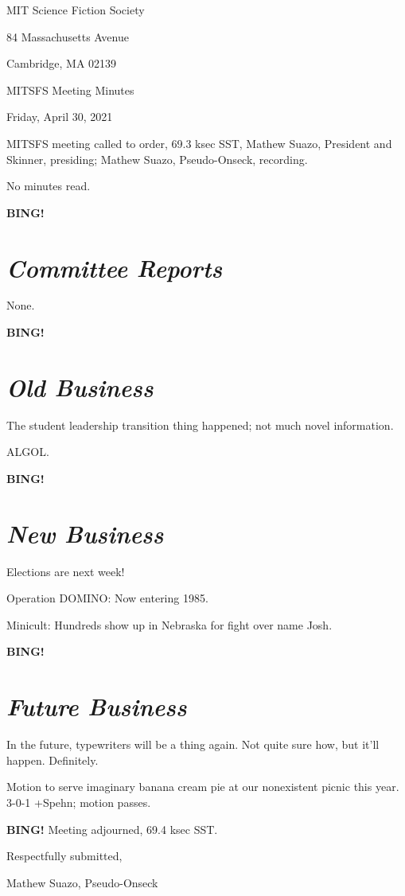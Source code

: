\documentclass[10pt]{article}
\newcommand{\bing}{{\bf BING!} }
\newcommand{\goto}[1]{\bing \vskip 12pt \section*{{\em{#1}}}}
\newcommand{\skinner}{Mathew Suazo, President and Skinner\xspace}
\newcommand{\onseck}{Mathew Suazo, Pseudo-Onseck\xspace}
\newcommand{\meetingdate}{Friday, April 30, 2021}
\begin{document}
\begin{center}

MIT Science Fiction Society

84 Massachusetts Avenue

Cambridge, MA 02139

\vspace{12pt}

MITSFS Meeting Minutes

\meetingdate

\end{center}

\vspace{18pt}

\setlength{\parskip}{6pt}

\noindent
MITSFS meeting called to order, 69.3 ksec SST,
\skinner, presiding; \onseck, recording.

No minutes read.

\goto{Committee Reports}

None.

\goto{Old Business}

The student leadership transition thing happened; not much novel information.

ALGOL.

\goto{New Business}

Elections are next week!

Operation DOMINO: Now entering 1985.

Minicult: Hundreds show up in Nebraska for fight over name Josh.

\goto{Future Business}

In the future, typewriters will be a thing again. Not quite sure how, but it'll happen. Definitely.

Motion to serve imaginary banana cream pie at our nonexistent picnic this year. 3-0-1 +Spehn; motion passes.

\bing
\noindent
Meeting adjourned, 69.4 ksec SST.

\vspace{18pt}

\centerline{Respectfully submitted,}
\centerline{\onseck}
\end{document}
